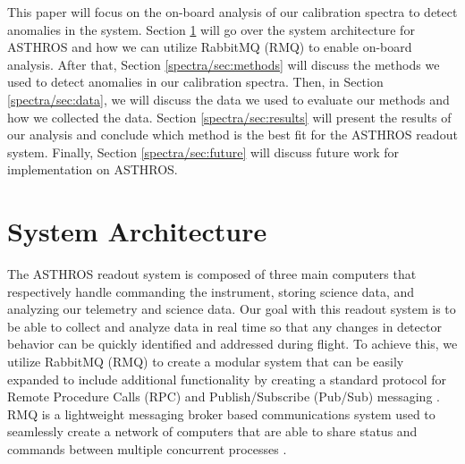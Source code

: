 This paper will focus on the on-board analysis of our calibration spectra to detect anomalies in the system.
Section \ref{spectra/sec:system} will go over the system architecture for ASTHROS and how we can utilize RabbitMQ (RMQ) to enable on-board analysis.
After that, Section \ref{spectra/sec:methods} will discuss the methods we used to detect anomalies in our calibration spectra.
Then, in Section \ref{spectra/sec:data}, we will discuss the data we used to evaluate our methods and how we collected the data.
Section \ref{spectra/sec:results} will present the results of our analysis and conclude which method is the best fit for the ASTHROS readout system.
Finally, Section \ref{spectra/sec:future} will discuss future work for implementation on ASTHROS. 

\section{System Architecture}
\label{spectra/sec:system}
The ASTHROS readout system is composed of three main computers that respectively handle commanding the instrument, storing science data, and analyzing our telemetry and science data. 
Our goal with this readout system is to be able to collect and analyze data in real time so that any changes in detector behavior can be quickly identified and addressed during flight. 
To achieve this, we utilize RabbitMQ (RMQ) to create a modular system that can be easily expanded to include additional functionality by creating a standard protocol for Remote Procedure Calls (RPC) and Publish/Subscribe (Pub/Sub) messaging \parencite{dobbelaere2017kafkaversusrabbitmq}.
RMQ is a lightweight messaging broker based communications system used to seamlessly create a network of computers that are able to share status and commands between multiple concurrent processes \parencite{thompson2024architecture}.

